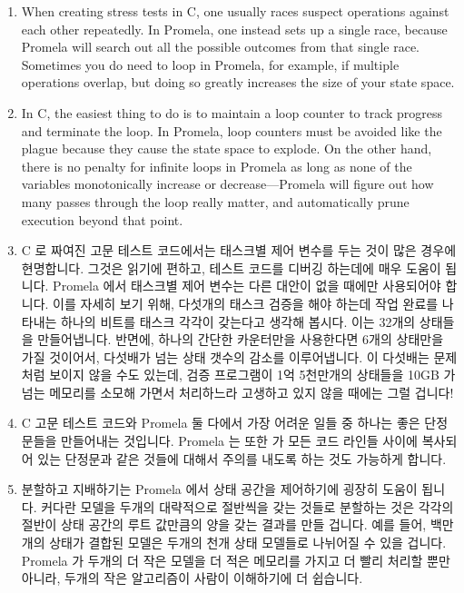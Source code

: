 \begin{enumerate}
\item	When creating stress tests in C, one usually races suspect operations
	against each other repeatedly.	In Promela, one instead sets up
	a single race, because Promela will search out all the possible
	outcomes from that single race.	Sometimes you do need to loop
	in Promela, for example, if multiple operations overlap, but
	doing so greatly increases the size of your state space.
\item	In C, the easiest thing to do is to maintain a loop counter to track
	progress and terminate the loop.  In Promela, loop counters
	must be avoided like the plague because they cause the state
	space to explode.  On the other hand, there is no penalty for
	infinite loops in Promela as long as none of the variables
	monotonically increase or decrease---Promela will figure out
	how many passes through the loop really matter, and automatically
	prune execution beyond that point.
\fi
\item	C 로 짜여진 고문 테스트 코드에서는 태스크별 제어 변수를 두는 것이 많은
	경우에 현명합니다.
	그것은 읽기에 편하고, 테스트 코드를 디버깅 하는데에 매우 도움이 됩니다.
	Promela 에서 태스크별 제어 변수는 다른 대안이 없을 때에만 사용되어야
	합니다.
	이를 자세히 보기 위해, 다섯개의 태스크 검증을 해야 하는데 작업 완료를
	나타내는 하나의 비트를 태스크 각각이 갖는다고 생각해 봅시다.
	이는 32개의 상태들을 만들어냅니다.
	반면에, 하나의 간단한 카운터만을 사용한다면 6개의 상태만을 가질
	것이어서, 다섯배가 넘는 상태 갯수의 감소를 이루어냅니다.
	이 다섯배는 문제처럼 보이지 않을 수도 있는데, 검증 프로그램이 1억
	5천만개의 상태들을 10GB 가 넘는 메모리를 소모해 가면서 처리하느라
	고생하고 있지 않을 때에는 그럴 겁니다!
\item	C 고문 테스트 코드와 Promela 둘 다에서 가장 어려운 일들 중 하나는 좋은
	단정문들을 만들어내는 것입니다.
	Promela 는 또한  가 모든 코드 라인들 사이에 복사되어 있는
	단정문과 같은 것들에 대해서 주의를 내도록 하는 것도 가능하게 합니다.
\item	분할하고 지배하기는 Promela 에서 상태 공간을 제어하기에 굉장히 도움이
	됩니다.
	커다란 모델을 두개의 대략적으로 절반씩을 갖는 것들로 분할하는 것은
	각각의 절반이 상태 공간의 루트 값만큼의 양을 갖는 결과를 만들 겁니다.
	예를 들어, 백만개의 상태가 결합된 모델은 두개의 천개 상태 모델들로
	나뉘어질 수 있을 겁니다.
	Promela 가 두개의 더 작은 모델을 더 적은 메모리를 가지고 더 빨리 처리할
	뿐만 아니라, 두개의 작은 알고리즘이 사람이 이해하기에 더 쉽습니다.
\iffalse


\end{enumerate}

